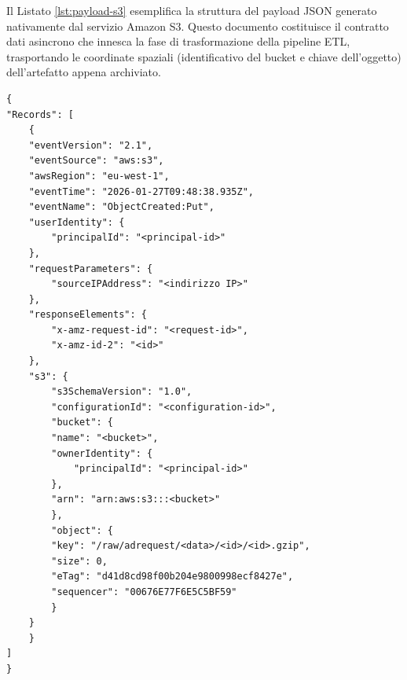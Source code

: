 Il Listato \ref{lst:payload-s3} esemplifica la struttura del payload JSON generato nativamente dal servizio Amazon S3. Questo documento costituisce il contratto dati asincrono che innesca la fase di trasformazione della pipeline ETL, trasportando le coordinate spaziali (identificativo del bucket e chiave dell'oggetto) dell'artefatto appena archiviato.

\begin{lstlisting}[label={lst:payload-s3}]
{
"Records": [
    {
    "eventVersion": "2.1",
    "eventSource": "aws:s3",
    "awsRegion": "eu-west-1",
    "eventTime": "2026-01-27T09:48:38.935Z",
    "eventName": "ObjectCreated:Put",
    "userIdentity": {
        "principalId": "<principal-id>"
    },
    "requestParameters": {
        "sourceIPAddress": "<indirizzo IP>"
    },
    "responseElements": {
        "x-amz-request-id": "<request-id>",
        "x-amz-id-2": "<id>"
    },
    "s3": {
        "s3SchemaVersion": "1.0",
        "configurationId": "<configuration-id>",
        "bucket": {
        "name": "<bucket>",
        "ownerIdentity": {
            "principalId": "<principal-id>"
        },
        "arn": "arn:aws:s3:::<bucket>"
        },
        "object": {
        "key": "/raw/adrequest/<data>/<id>/<id>.gzip",
        "size": 0,
        "eTag": "d41d8cd98f00b204e9800998ecf8427e",
        "sequencer": "00676E77F6E5C5BF59"
        }
    }
    }
]
}
\end{lstlisting}